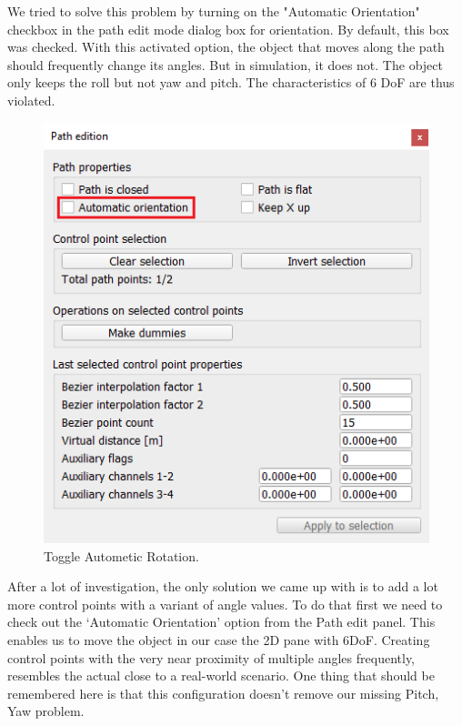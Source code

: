 We tried to solve this problem by turning on the "Automatic Orientation" checkbox in the path edit mode dialog box for orientation. By default, this box was checked. With this activated option, the object that moves along the path should frequently change its angles. But in simulation, it does not. The object only keeps the roll but not yaw and pitch. The characteristics of 6 
DoF are thus violated.

\begin{figure}[h]
  \centering
    \includegraphics[width=0.4\linewidth]{figures/uncheckAuto.png}
    \caption{Toggle Autometic Rotation.}
\label{fig:TAutoRotation}
\end{figure}

After a lot of investigation, the only solution we came up with is to add a lot more control points with a variant of angle values.  To do that first we need to check out the ‘Automatic Orientation’ option from the Path edit panel. This enables us to move the object in our case the 2D pane with 6DoF.
Creating control points with the very near proximity of multiple angles frequently, resembles the actual close to a real-world scenario. One thing that should be remembered here is that this configuration doesn't remove our missing Pitch, Yaw problem.


